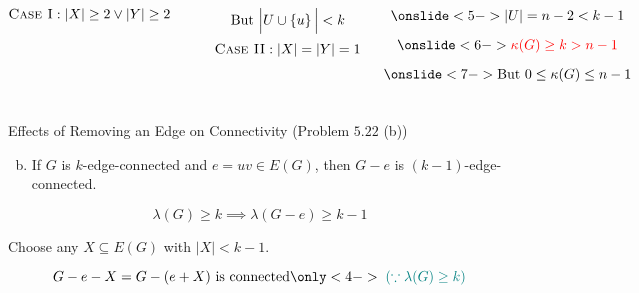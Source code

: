 \begin{frame}{}

  \begin{columns}
      \pause
      \[
	\textsc{Case I}: |X| \ge 2 \lor |Y| \ge 2
      \]

      \pause
      \begin{center}
      \end{center}
      \[
	\text{But } \Big\lvert U \cup \left\{u\right\} \Big \rvert < k
      \]
      \pause
      \[
	\textsc{Case II}: |X| = |Y| = 1
      \]

      \pause
      \vspace{-0.60cm}
      \begin{gather*}
	\onslide<5->{|U| = n - 2 < k - 1} \\[6pt]
	\onslide<6->{\red{\kappa(G) \ge k > n - 1}} \\[6pt]
	\onslide<7->{\text{But } 0 \le \kappa(G) \le n - 1}
      \end{gather*}
  \end{columns}
\end{frame}

\begin{frame}{}
  \begin{exampleblock}{Effects of Removing an Edge on Connectivity (Problem $5.22$\; (b))}
    \begin{enumerate}[(a)]
      \setcounter{enumi}{1}
      \item If $G$ is $k$-edge-connected and $e = uv \in E(G)$, then $G - e$ is $(k-1)$-edge-connected.
    \end{enumerate}
  \end{exampleblock}

  \[
    \lambda(G) \ge k \implies \lambda(G - e) \ge k-1
  \]

  \pause
  \vspace{0.50cm}
  \begin{center}
    Choose any $X \subseteq E(G)$ with $|X| < k - 1$. \\[6pt]
  \end{center}

  \pause
  \[
    G - e - X = G - (e + X) \text{ is connected} \only<4->{\;\teal{(\because \lambda(G) \ge k)}}
  \]
\end{frame}


